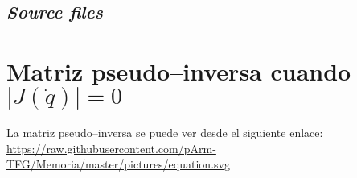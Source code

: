 \section{\textit{Source files}}





% 


















\newpage
\chapter{Matriz pseudo--inversa cuando $\left|J\left(\dot{q}\right)\right| = 0$}
\label{anex:pinv}
La matriz pseudo--inversa se puede ver desde el siguiente enlace:
\url{https://raw.githubusercontent.com/pArm-TFG/Memoria/master/pictures/equation.svg}\qquad
{}

